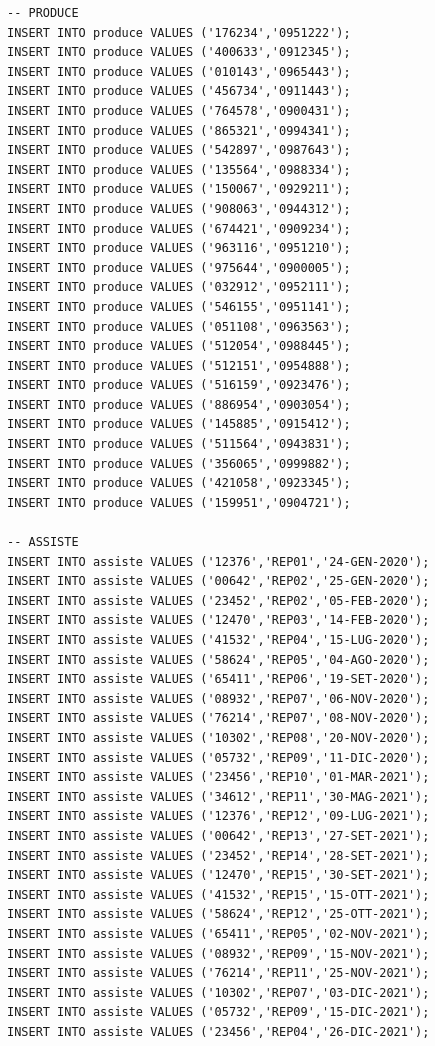 \documentclass[12pt]{report}
\begin{document}
\begin{scriptsize}
\begin{verbatim}
-- PRODUCE
INSERT INTO produce VALUES ('176234','0951222');                          
INSERT INTO produce VALUES ('400633','0912345');
INSERT INTO produce VALUES ('010143','0965443');
INSERT INTO produce VALUES ('456734','0911443');
INSERT INTO produce VALUES ('764578','0900431');
INSERT INTO produce VALUES ('865321','0994341');
INSERT INTO produce VALUES ('542897','0987643');
INSERT INTO produce VALUES ('135564','0988334');
INSERT INTO produce VALUES ('150067','0929211');
INSERT INTO produce VALUES ('908063','0944312');
INSERT INTO produce VALUES ('674421','0909234');
INSERT INTO produce VALUES ('963116','0951210');
INSERT INTO produce VALUES ('975644','0900005');
INSERT INTO produce VALUES ('032912','0952111');
INSERT INTO produce VALUES ('546155','0951141');
INSERT INTO produce VALUES ('051108','0963563');
INSERT INTO produce VALUES ('512054','0988445');
INSERT INTO produce VALUES ('512151','0954888');
INSERT INTO produce VALUES ('516159','0923476');
INSERT INTO produce VALUES ('886954','0903054');
INSERT INTO produce VALUES ('145885','0915412');
INSERT INTO produce VALUES ('511564','0943831');
INSERT INTO produce VALUES ('356065','0999882');
INSERT INTO produce VALUES ('421058','0923345');
INSERT INTO produce VALUES ('159951','0904721');

-- ASSISTE
INSERT INTO assiste VALUES ('12376','REP01','24-GEN-2020');
INSERT INTO assiste VALUES ('00642','REP02','25-GEN-2020');
INSERT INTO assiste VALUES ('23452','REP02','05-FEB-2020');
INSERT INTO assiste VALUES ('12470','REP03','14-FEB-2020');
INSERT INTO assiste VALUES ('41532','REP04','15-LUG-2020');
INSERT INTO assiste VALUES ('58624','REP05','04-AGO-2020');
INSERT INTO assiste VALUES ('65411','REP06','19-SET-2020');
INSERT INTO assiste VALUES ('08932','REP07','06-NOV-2020');
INSERT INTO assiste VALUES ('76214','REP07','08-NOV-2020');
INSERT INTO assiste VALUES ('10302','REP08','20-NOV-2020');
INSERT INTO assiste VALUES ('05732','REP09','11-DIC-2020');
INSERT INTO assiste VALUES ('23456','REP10','01-MAR-2021');
INSERT INTO assiste VALUES ('34612','REP11','30-MAG-2021');
INSERT INTO assiste VALUES ('12376','REP12','09-LUG-2021');
INSERT INTO assiste VALUES ('00642','REP13','27-SET-2021');
INSERT INTO assiste VALUES ('23452','REP14','28-SET-2021');
INSERT INTO assiste VALUES ('12470','REP15','30-SET-2021');
INSERT INTO assiste VALUES ('41532','REP15','15-OTT-2021');
INSERT INTO assiste VALUES ('58624','REP12','25-OTT-2021');
INSERT INTO assiste VALUES ('65411','REP05','02-NOV-2021');
INSERT INTO assiste VALUES ('08932','REP09','15-NOV-2021');
INSERT INTO assiste VALUES ('76214','REP11','25-NOV-2021');
INSERT INTO assiste VALUES ('10302','REP07','03-DIC-2021');
INSERT INTO assiste VALUES ('05732','REP09','15-DIC-2021');
INSERT INTO assiste VALUES ('23456','REP04','26-DIC-2021');


\end{verbatim}
\end{scriptsize}
\end{document}
